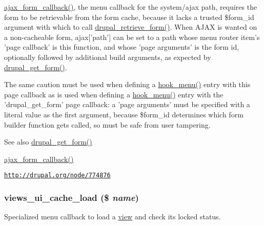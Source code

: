 \hyperlink{group__ajax_gabe2739824006df057d291f6be49759ab}{ajax\_\-form\_\-callback()}, the menu callback for the system/ajax path, requires the form to be retrievable from the form cache, because it lacks a trusted \$form\_\-id argument with which to call \hyperlink{group__form__api_ga82f16e1c86833aa88bf93adf93bae9bb}{drupal\_\-retrieve\_\-form()}. When AJAX is wanted on a non-\/cacheable form, ajax\mbox{[}'path'\mbox{]} can be set to a path whose menu router item's 'page callback' is this function, and whose 'page arguments' is the form id, optionally followed by additional build arguments, as expected by \hyperlink{group__form__api_ga720df81a837b06dfe19daf1c1eea3437}{drupal\_\-get\_\-form()}.

The same caution must be used when defining a \hyperlink{group__hooks_ga5c95244fea59b25666e409759e133ded}{hook\_\-menu()} entry with this page callback as is used when defining a \hyperlink{group__hooks_ga5c95244fea59b25666e409759e133ded}{hook\_\-menu()} entry with the 'drupal\_\-get\_\-form' page callback: a 'page arguments' must be specified with a literal value as the first argument, because \$form\_\-id determines which form builder function gets called, so must be safe from user tampering.

\begin{DoxySeeAlso}{See also}
\hyperlink{group__form__api_ga720df81a837b06dfe19daf1c1eea3437}{drupal\_\-get\_\-form()} 

\hyperlink{group__ajax_gabe2739824006df057d291f6be49759ab}{ajax\_\-form\_\-callback()} 

\href{http://drupal.org/node/774876}{\tt http://drupal.org/node/774876} 
\end{DoxySeeAlso}
\hypertarget{views__ui_8module_a89d147761be3afc8b2728b071a2ac7f8}{
\subsubsection[{views\_\-ui\_\-cache\_\-load}]{\setlength{\rightskip}{0pt plus 5cm}views\_\-ui\_\-cache\_\-load (\$ {\em name})}}
\label{views__ui_8module_a89d147761be3afc8b2728b071a2ac7f8}
Specialized menu callback to load a \hyperlink{classview}{view} and check its locked status.


